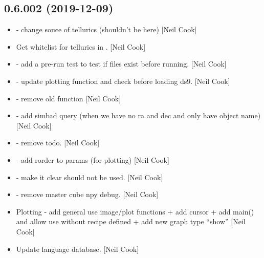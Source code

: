 \documentclass[a4paper,10pt,english]{report}
\begin{document}
\subsection{0.6.002 (2019-12-09)}
\label{\detokenize{misc/changelog:id16}}\begin{itemize}
\item {} 
 - change souce of tellurics (shouldn’t be
here) {[}Neil Cook{]}

\item {} 
Get whitelist for tellurics in . {[}Neil Cook{]}

\item {} 
 - add a pre-run test to test if
files exist before running. {[}Neil Cook{]}

\item {} 
 - update plotting function and
check before loading ds9. {[}Neil Cook{]}

\item {} 
 - remove old function 
{[}Neil Cook{]}

\item {} 
 - add simbad query (when we have no ra
and dec and only have object name) {[}Neil Cook{]}

\item {} 
 - remove todo. {[}Neil Cook{]}

\item {} 
 - add rorder to params (for plotting)
{[}Neil Cook{]}

\item {} 
 - make it clear 
should not be used. {[}Neil Cook{]}

\item {} 
 - remove master cube npy
debug. {[}Neil Cook{]}

\item {} 
Plotting - add general use image/plot functions + add cursor + add
main() and allow use without recipe defined + add new graph type
“show” {[}Neil Cook{]}

\item {} 
Update language database. {[}Neil Cook{]}


\end{itemize}
\end{document}
